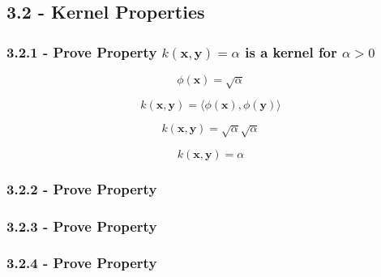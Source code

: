 \documentclass[10pt]{article}
\begin{document}
\subsection{3.2 - Kernel Properties}
\subsubsection{3.2.1 - Prove Property $k(\textbf{x},\textbf{y}) = \alpha $ is a kernel for $\alpha > 0$}

\[
\phi(\textbf{x}) = \sqrt{\alpha}
\]

\[
k(\textbf{x},\textbf{y}) = \langle \phi(\textbf{x}), \phi(\textbf{y}) \rangle
\]

\[
k(\textbf{x},\textbf{y}) = \sqrt{\alpha} \sqrt{\alpha}
\]

\[
k(\textbf{x},\textbf{y}) = \alpha
\]

\subsubsection{3.2.2 - Prove Property}
\subsubsection{3.2.3 - Prove Property}
\subsubsection{3.2.4 - Prove Property}



\pagebreak
\end{document}
